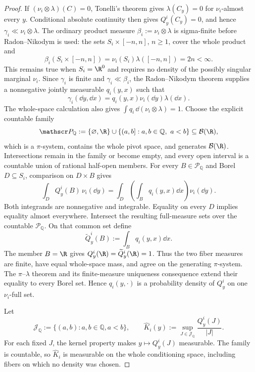 \begin{proof}
If $(\nu_i\otimes\lambda)(C)=0$, Tonelli's theorem
\citep[Chapter~2]{Folland1999} gives
$\lambda(C_y)=0$ for $\nu_i$-almost every $y$.  Conditional absolute
continuity then gives $Q^i_y(C_y)=0$, and hence
$\gamma_i\ll\nu_i\otimes\lambda$.  The ordinary product measure
$\beta_i:=\nu_i\otimes\lambda$ is sigma-finite before Radon--Nikodym is
used: the sets $S_i\times[-n,n]$, $n\geq1$, cover the whole product and
\[
\beta_i(S_i\times[-n,n])
=\nu_i(S_i)\lambda([-n,n])=2n<\infty.
\]
This remains true when $S_i=\R^0$ and requires no density of the possibly
singular marginal $\nu_i$.  Since $\gamma_i$ is finite and
$\gamma_i\ll\beta_i$, the Radon--Nikodym theorem
\citep[Chapter~3]{Folland1999} supplies a
nonnegative jointly measurable $q_i(y,x)$ such that
\[
\gamma_i(\dd y,\dd x)=q_i(y,x)\nu_i(\dd y)\lambda(\dd x).
\]
The whole-space calculation also gives
$\int q_i\,\dd(\nu_i\otimes\lambda)=1$.
Choose the explicit countable family
\[
\mathscr P_{\mathbb Q}:=\{\varnothing,\R\}
 \cup\{(a,b]:a,b\in\mathbb Q,\ a<b\}
\subseteq\mathcal B(\R),
\]
which is a $\pi$-system, contains the whole pivot space, and generates
$\mathcal B(\R)$.  Intersections remain in the family or become empty, and
every open interval is a countable union of rational half-open members.  For
every $B\in\mathscr P_{\mathbb Q}$ and Borel $D\subseteq S_i$, comparison on
$D\times B$ gives
\[
\int_DQ^i_y(B)\,\nu_i(\dd y)
=\int_D\!\left(\int_Bq_i(y,x)\dd x\right)\nu_i(\dd y).
\]
Both integrands are nonnegative and integrable.  Equality on every $D$
implies equality almost everywhere.  Intersect the resulting full-measure
sets over the countable $\mathscr P_{\mathbb Q}$.  On that common set define
\[
\widetilde Q^i_y(B):=\int_Bq_i(y,x)\dd x.
\]
The member $B=\R$ gives
$Q^i_y(\R)=\widetilde Q^i_y(\R)=1$.  Thus the two fiber measures are finite,
have equal whole-space mass, and agree on the generating $\pi$-system.
The $\pi$--$\lambda$ theorem and its finite-measure uniqueness consequence
\citep[Chapter~1]{Folland1999} extend their equality to every Borel set.
Hence $q_i(y,\cdot)$ is a probability density of $Q^i_y$ on one
$\nu_i$-full set.

Let
\[
\mathscr J_{\mathbb Q}:=\{(a,b):a,b\in\mathbb Q, a<b\},
\qquad
\widehat K_i(y):=\sup_{J\in\mathscr J_{\mathbb Q}}
\frac{Q^i_y(J)}{|J|}.
\]
For each fixed $J$, the kernel property makes $y\mapsto Q^i_y(J)$
measurable.  The family is countable, so $\widehat K_i$ is measurable on the
whole conditioning space, including fibers on which no density was chosen.


\end{proof}
